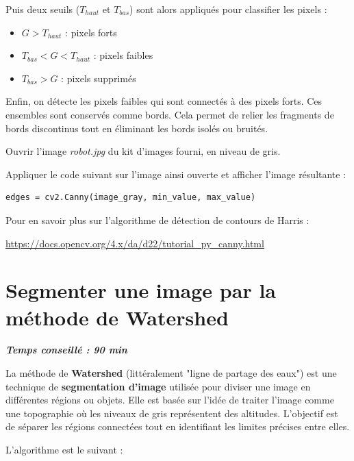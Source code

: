 \documentclass[a4paper,11pt,titlepage]{article} %
\begin{document}
Puis deux seuils ($T_{haut}$ et $T_{bas}$) sont alors appliqués pour classifier les pixels :

\begin{itemize}
	\item $G > T_{haut}$ : pixels forts
	\item $T_{bas} < G < T_{haut}$ : pixels faibles
	\item $T_{bas} > G$ : pixels supprimés
\end{itemize}

Enfin, on détecte les pixels faibles qui sont connectés à des pixels forts. Ces ensembles sont conservés comme bords. Cela permet de relier les fragments de bords discontinus tout en éliminant les bords isolés ou bruités.

\medskip

\Manip Ouvrir l'image \textsl{robot.jpg} du kit d'images fourni, en niveau de gris. 

\Manip Appliquer le code suivant sur l'image ainsi ouverte et afficher l'image résultante :

\begin{lstlisting}
edges = cv2.Canny(image_gray, min_value, max_value)
\end{lstlisting}

\medskip

Pour en savoir plus sur l'algorithme de détection de contours de Harris : 

\href{https://docs.opencv.org/4.x/da/d22/tutorial_py_canny.html}{https://docs.opencv.org/4.x/da/d22/tutorial\_py\_canny.html} 


\newpage
\section{Segmenter une image par la méthode de Watershed}

\begin{center} \textbf{\textit{Temps conseillé : 90 min}} \end{center}

La méthode de \textbf{Watershed} (littéralement "ligne de partage des eaux") est une technique de \textbf{segmentation d'image} utilisée pour diviser une image en différentes régions ou objets. Elle est basée sur l'idée de traiter l'image comme une topographie où les niveaux de gris représentent des altitudes. L'objectif est de séparer les régions connectées tout en identifiant les limites précises entre elles.

L'algorithme est le suivant :
\end{document}
